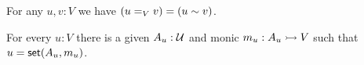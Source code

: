 \documentclass[hott-all.tex]{subfiles}
\begin{document}
%
% 
\begin{lem}
For any $u,v:V$ we have $(u=_V v) = (u \sim v)$.
\end{lem}
% 
% 
% 
% 
\begin{lem}
For every $u:V$ there is a given $A_u:\mathcal{U}$ and monic $m_u: A_u \rightarrowtail V$ such that $u = \mathsf{set}(A_u, m_u)$.
\end{lem}
% 
\end{document}
